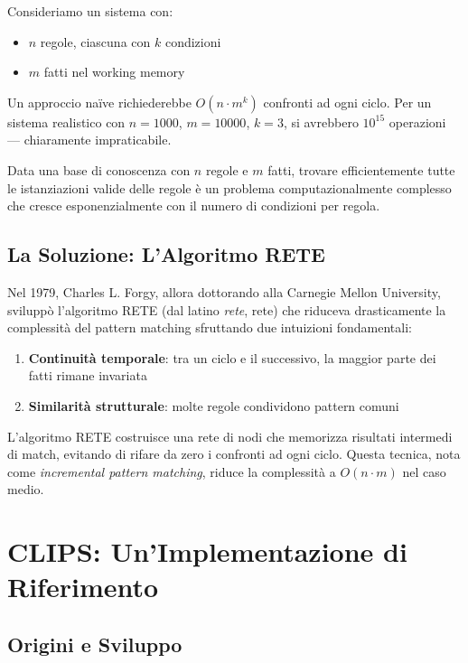 Consideriamo un sistema con:
\begin{itemize}
\item $n$ regole, ciascuna con $k$ condizioni
\item $m$ fatti nel working memory
\end{itemize}

Un approccio naïve richiederebbe $O(n \cdot m^k)$ confronti ad ogni ciclo. Per un sistema realistico con $n=1000$, $m=10000$, $k=3$, si avrebbero $10^{15}$ operazioni --- chiaramente impraticabile.

\begin{infobox}
Data una base di conoscenza con $n$ regole e $m$ fatti, trovare efficientemente tutte le istanziazioni valide delle regole è un problema computazionalmente complesso che cresce esponenzialmente con il numero di condizioni per regola.
\end{infobox}

\subsection{La Soluzione: L'Algoritmo RETE}

Nel 1979, Charles L. Forgy, allora dottorando alla Carnegie Mellon University, sviluppò l'algoritmo RETE (dal latino \textit{rete}, rete) che riduceva drasticamente la complessità del pattern matching sfruttando due intuizioni fondamentali:

\begin{enumerate}
\item \textbf{Continuità temporale}: tra un ciclo e il successivo, la maggior parte dei fatti rimane invariata
\item \textbf{Similarità strutturale}: molte regole condividono pattern comuni
\end{enumerate}

L'algoritmo RETE costruisce una rete di nodi che memorizza risultati intermedi di match, evitando di rifare da zero i confronti ad ogni ciclo. Questa tecnica, nota come \textit{incremental pattern matching}, riduce la complessità a $O(n \cdot m)$ nel caso medio.

\section{CLIPS: Un'Implementazione di Riferimento}

\subsection{Origini e Sviluppo}

